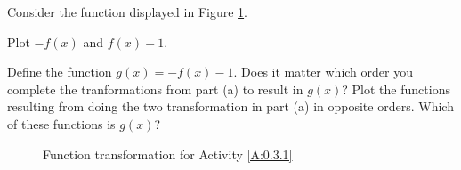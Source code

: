 \begin{activity}\label{A:0.3.1}
    Consider the function displayed in Figure \ref{F:0.3.Act1}.
    \ba
        \item Plot $-f(x)$ and $f(x)-1$.
        \item Define the function $g(x) = -f(x)-1$.  Does it matter which order you
            complete the tranformations from part (a) to result in $g(x)$?  Plot the
            functions resulting from doing the two transformation in part (a) in opposite
            orders.  Which of these functions is $g(x)$?
    \ea
    \begin{figure}[h!]
        \begin{center}
        \end{center}
        \caption{Function transformation for Activity \ref{A:0.3.1}} \label{F:0.3.Act1}
    \end{figure}
\end{activity}\aftera
